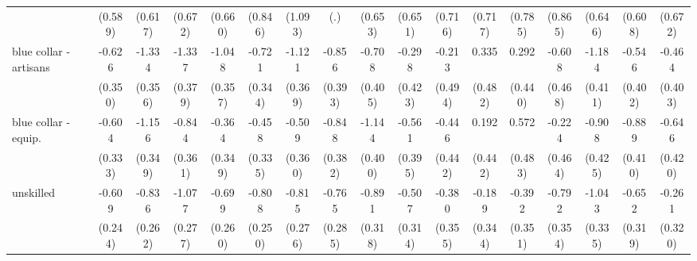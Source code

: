 {\begin{tabular}{l*{16}{c}}
                    &     (0.589)         &     (0.617)         &     (0.672)         &     (0.660)         &     (0.846)         &     (1.093)         &         (.)         &     (0.653)         &     (0.651)         &     (0.716)         &     (0.717)         &     (0.785)         &     (0.865)         &     (0.646)         &     (0.608)         &     (0.672)         \\
[1em]
blue collar - artisans&      -0.626         &      -1.334\sym{***}&      -1.337\sym{***}&      -1.048\sym{**} &      -0.721\sym{*}  &      -1.121\sym{**} &      -0.856\sym{*}  &      -0.708         &      -0.298         &      -0.213         &       0.335         &       0.292         &      -0.608         &      -1.184\sym{**} &      -0.546         &      -0.464         \\
                    &     (0.350)         &     (0.356)         &     (0.379)         &     (0.357)         &     (0.344)         &     (0.369)         &     (0.393)         &     (0.405)         &     (0.423)         &     (0.494)         &     (0.482)         &     (0.440)         &     (0.468)         &     (0.411)         &     (0.402)         &     (0.403)         \\
[1em]
blue collar - equip.&      -0.604         &      -1.156\sym{***}&      -0.844\sym{*}  &      -0.364         &      -0.458         &      -0.509         &      -0.848\sym{*}  &      -1.144\sym{**} &      -0.561         &      -0.446         &       0.192         &       0.572         &      -0.224         &      -0.908\sym{*}  &      -0.889\sym{*}  &      -0.646         \\
                    &     (0.333)         &     (0.349)         &     (0.361)         &     (0.349)         &     (0.335)         &     (0.360)         &     (0.382)         &     (0.400)         &     (0.395)         &     (0.442)         &     (0.442)         &     (0.483)         &     (0.464)         &     (0.425)         &     (0.410)         &     (0.420)         \\
[1em]
unskilled           &      -0.609\sym{*}  &      -0.836\sym{**} &      -1.077\sym{***}&      -0.699\sym{**} &      -0.808\sym{**} &      -0.815\sym{**} &      -0.765\sym{**} &      -0.891\sym{**} &      -0.507         &      -0.380         &      -0.189         &      -0.392         &      -0.792\sym{*}  &      -1.043\sym{**} &      -0.652\sym{*}  &      -0.261         \\
                    &     (0.244)         &     (0.262)         &     (0.277)         &     (0.260)         &     (0.250)         &     (0.276)         &     (0.285)         &     (0.318)         &     (0.314)         &     (0.355)         &     (0.344)         &     (0.351)         &     (0.354)         &     (0.335)         &     (0.319)         &     (0.320)         \\

\end{tabular}}
